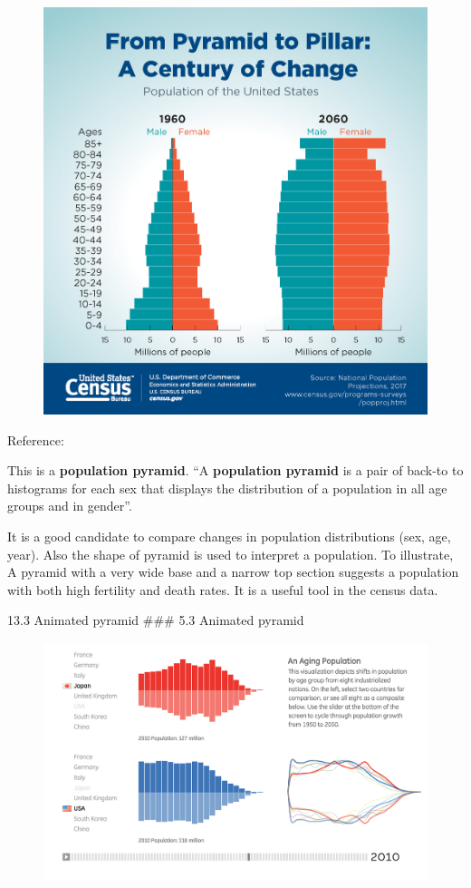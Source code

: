 \documentclass[]{book}
\theoremstyle{definition}
\theoremstyle{definition}
\theoremstyle{definition}
\theoremstyle{remark}
\begin{document}
\begin{figure}
\centering
\includegraphics{images/Pyramid.jpg}
\caption{}
\end{figure}

Reference: \citep{population_pyramid}

This is a \textbf{population pyramid}. ``A \textbf{population pyramid}
is a pair of back-to to histograms for each sex that displays the
distribution of a population in all age groups and in gender''.

It is a good candidate to compare changes in population distributions
(sex, age, year). Also the shape of pyramid is used to interpret a
population. To illustrate, A pyramid with a very wide base and a narrow
top section suggests a population with both high fertility and death
rates. It is a useful tool in the census data.

13.3 Animated pyramid \citep{animated_pyramid} \#\#\# 5.3 Animated
pyramid

\begin{figure}
\centering
\includegraphics{images/3_1.png}
\caption{}
\end{figure}
\end{document}
